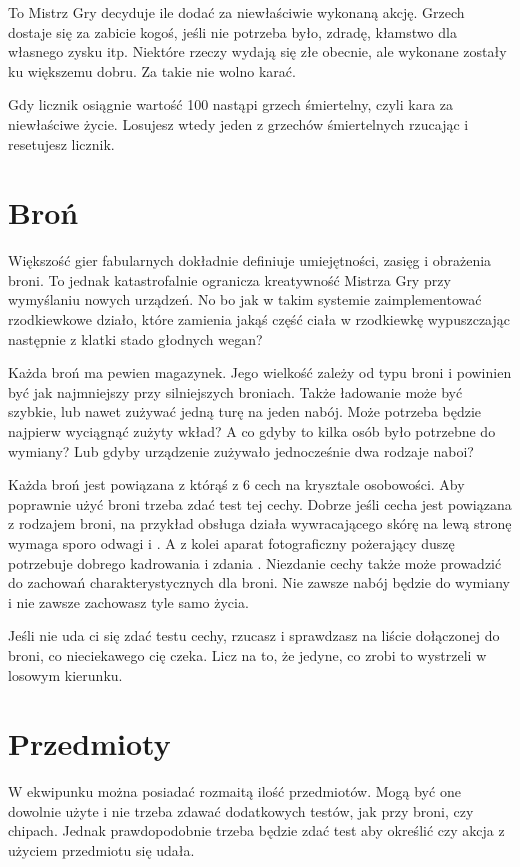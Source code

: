 To Mistrz Gry decyduje ile \abgrz{} dodać za niewłaściwie wykonaną akcję.
Grzech dostaje się za zabicie kogoś, jeśli nie potrzeba było, zdradę, kłamstwo dla własnego zysku itp.
Niektóre rzeczy wydają się złe obecnie, ale wykonane zostały ku większemu dobru. Za takie nie wolno karać.

Gdy licznik \abgrz{} osiągnie wartość 100 nastąpi grzech śmiertelny, czyli kara za niewłaściwe życie.
Losujesz wtedy jeden z grzechów śmiertelnych rzucając \dxx{} i resetujesz licznik.

\section{Broń}
Większość gier fabularnych dokładnie definiuje umiejętności, zasięg i obrażenia broni.
To jednak katastrofalnie ogranicza kreatywność Mistrza Gry przy wymyślaniu nowych urządzeń.
No bo jak w takim systemie zaimplementować rzodkiewkowe działo, które zamienia jakąś część ciała w rzodkiewkę wypuszczając następnie z klatki stado głodnych wegan?

Każda broń ma pewien magazynek.
Jego wielkość zależy od typu broni i powinien być jak najmniejszy przy silniejszych broniach.
Także ładowanie może być szybkie, lub nawet zużywać jedną turę na jeden nabój.
Może potrzeba będzie najpierw wyciągnąć zużyty wkład?
A co gdyby to kilka osób było potrzebne do wymiany?
Lub gdyby urządzenie zużywało jednocześnie dwa rodzaje naboi?

Każda broń jest powiązana z którąś z 6 cech na krysztale osobowości.
Aby poprawnie użyć broni trzeba zdać test tej cechy.
Dobrze jeśli cecha jest powiązana z rodzajem broni, na przykład obsługa działa wywracającego skórę na lewą stronę wymaga sporo odwagi i \abh{}.
A z kolei aparat fotograficzny pożerający duszę potrzebuje dobrego kadrowania i zdania \abp{}.
Niezdanie cechy także może prowadzić do zachowań charakterystycznych dla broni.
Nie zawsze nabój będzie do wymiany i nie zawsze zachowasz tyle samo życia.

Jeśli nie uda ci się zdać testu cechy, rzucasz \dx{} i sprawdzasz na liście dołączonej do broni, co nieciekawego cię czeka.
Licz na to, że jedyne, co zrobi to wystrzeli w losowym kierunku.

\section{Przedmioty}
W ekwipunku można posiadać rozmaitą ilość przedmiotów.
Mogą być one dowolnie użyte i nie trzeba zdawać dodatkowych testów, jak przy broni, czy chipach.
Jednak prawdopodobnie trzeba będzie zdać test aby określić czy akcja z użyciem przedmiotu się udała.

